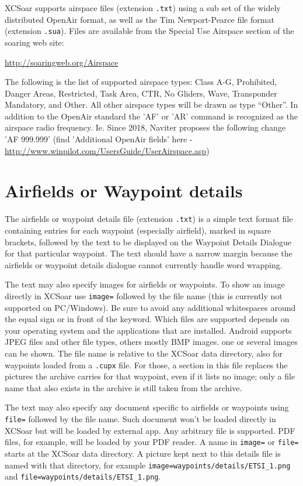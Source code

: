 XCSoar supports airspace files (extension \verb|.txt|) using a sub set
of the widely distributed OpenAir format, as well as the Tim Newport-Pearce file
format (extension \verb|.sua|). Files are available from the
Special Use Airspace section of the soaring web site:

\url{http://soaringweb.org/Airspace}

The following is the list of supported airspace types: Class A-G, Prohibited, 
Danger Areas, Restricted, Task Area, CTR, No Gliders, Wave, Transponder 
Mandatory, and Other.  All other airspace types will be drawn as type ``Other''.
In addition to the OpenAir standard the 'AF' or 'AR' command is recognized as the airspace radio frequency.
Ie. Since 2018, Naviter proposes the following change 'AF 999.999' (find 'Additional OpenAir fields' here - \url{http://www.winpilot.com/UsersGuide/UserAirspace.asp})

\section{Airfields or Waypoint details}\label{sec:airfield-details}

The airfields or waypoint details file (extension \verb|.txt|) is a simple text
format file containing entries for each waypoint (especially airfield), marked in square
brackets, followed by the text to be displayed on the
Waypoint Details Dialogue for that particular waypoint.  The text should
have a narrow margin because the airfields or waypoint details dialogue cannot
currently handle word wrapping.

The text may also specify images for airfields or waypoints.  To
show an image directly in XCSoar use \verb|image=| followed by the file
name (this is currently not supported on PC/Windows).  Be sure
to avoid any additional whitespaces around the equal sign or in front of the
keyword. Which files are supported depends on your operating system and the
applications that are installed.  Android supports JPEG files and other
file types, others mostly BMP images. one or several images can be shown.
The file name is relative to the XCSoar data directory, also for
waypoints loaded from a \verb|.cupx| file. For those, a section in this
file replaces the pictures the archive carries for that waypoint, even if
it lists no image; only a file name that also exists in the archive is
still taken from the archive.

The text may also specify any document specific to airfields or waypoints using
\verb|file=| followed by the file name. Such document won't be loaded directly in XCSoar 
but will be loaded by external app. Any arbitrary file is supported. PDF files, for example,
will be loaded by your PDF reader.
A name in \verb|image=| or \verb|file=| starts at the XCSoar data
directory. A picture kept next to this details file is named with that
directory, for example \verb|image=waypoints/details/ETSI_1.png| and
\verb|file=waypoints/details/ETSI_1.png|.

